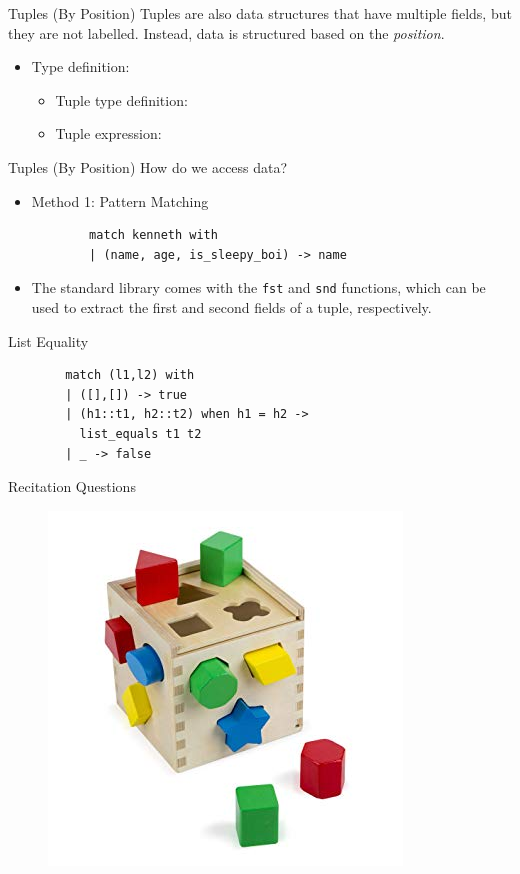 \documentclass{beamer}
\begin{document}
    \begin{frame}{Tuples (By Position)}
    Tuples are also data structures that have multiple fields, but they are not labelled. Instead, data is structured based on the \textit{position}.
    \begin{itemize}
        \item Type definition: 
    
        \begin{itemize}
            \item Tuple type definition: 
            \pause
            
            \item Tuple expression:
        \end{itemize}
    \end{itemize}
    \end{frame}
    
    
    \begin{frame}[fragile]{Tuples (By Position)}
    How do we access data?
    \begin{itemize}
        \item Method 1: Pattern Matching
        \begin{verbatim}
        match kenneth with
        | (name, age, is_sleepy_boi) -> name
        \end{verbatim}
        
        \item The standard library comes with the \texttt{fst} and \texttt{snd} functions, which can be used to extract the first and second fields of a tuple, respectively.
    \end{itemize}
    \end{frame}
    
    \begin{frame}[fragile]{List Equality}
     \pause
    \begin{verbatim}
        match (l1,l2) with
        | ([],[]) -> true
        | (h1::t1, h2::t2) when h1 = h2 -> 
          list_equals t1 t2
        | _ -> false
    \end{verbatim}
    \end{frame}
    
    \begin{frame}{Recitation Questions}
    \begin{figure}
        \centering
        \includegraphics[scale=0.5]{toy.jpg}
    \end{figure}
    \end{frame}
\end{document}
